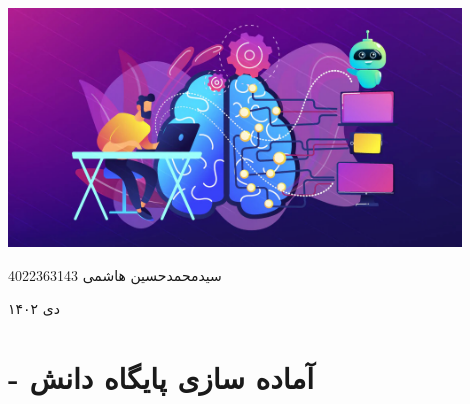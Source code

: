 \documentclass[12pt, dvipsnames, svgnames, x11names,]{article}
\begin{document}
	\begin{titlepage}
		\centering
		\vspace{1cm}
		{\Huge {\textbf{}}\par}
		\vspace{15mm}
		\vspace{16mm}
		\includegraphics[width=12cm]{images/01} \par
		\vfill \par	\vfill
		\vspace{16mm}
		{\normalsize	سیدمحمدحسین هاشمی  4022363143 \par}
		
		\vspace{1cm}
		{\large دی ۱۴۰۲\par}
	\end{titlepage}
	\tableofcontents
	
	\section{ - آماده سازی پایگاه دانش}
		
\end{document}

